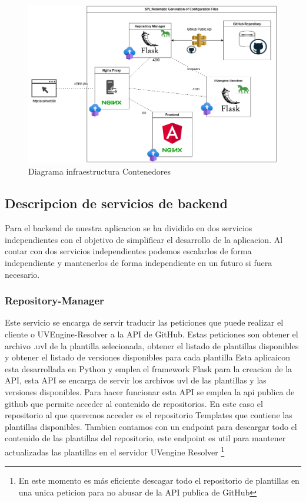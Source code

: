 \documentclass[12pt, a4paper, twoside]{article}
\begin{document}
\begin{figure}[h]
	\centering
	  \includegraphics[width=1\textwidth]{Arquitectura Contenedores.png}
	\caption{Diagrama infraestructura Contenedores}
\end{figure}

\newpage
\subsection{Descripcion de servicios de backend} 
Para el backend de nuestra aplicacion se ha dividido en dos servicios independientes con el objetivo de simplificar el desarrollo de la aplicacion.
Al contar con dos servicios independientes podemos escalarlos de forma independiente y mantenerlos de forma independiente en un futuro si fuera necesario.


\subsubsection{Repository-Manager}
Este servicio se encarga de servir traducir las peticiones que puede realizar el cliente o UVEngine-Resolver a la API de GitHub.
Estas peticiones son obtener el archivo .uvl de la plantilla selecionada, obtener el listado de plantillas disponibles y obtener el listado de versiones disponibles para cada plantilla
Esta aplicaicon esta desarrollada en Python y emplea el framework Flask para la creacion de la API, esta API se encarga de servir los archivos uvl de las plantillas y las versiones disponibles.
Para hacer funcionar esta API se emplea la api publica de github que permite acceder al contenido de repositorios. 
En este caso el repositorio al que queremos acceder es el repositorio Templates \cite{m4rdom_templates} que contiene las plantillas disponibles.
Tambien contamos con un endpoint para descargar todo el contenido de las plantillas del repositorio, este endpoint es util para mantener actualizadas las plantillas en el servidor UVengine Resolver \footnote{En este momento es más eficiente descagar todo el repositorio de plantillas en una unica peticion para no abusar de la API publica de GitHub}
\end{document}
